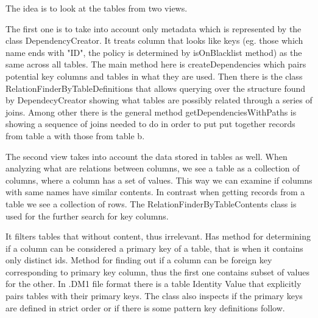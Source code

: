 The idea is to look at the tables from two views.

The first one is to take into account only metadata which is represented by the class DependencyCreator. It treats column that looks like keys (eg. those which name ends with "ID", the policy is determined by isOnBlacklist method) as the same across all tables. 
The main method here is createDependencies which pairs potential key columns and tables in what they are used.
Then there is the class RelationFinderByTableDefinitions that allows querying over the structure found by DependecyCreator showing what tables are possibly related through a series of joins.
Among other there is the general method getDependenciesWithPaths is showing a sequence of joins needed to do in order to put put together records from table a with those from table b.

The second view takes into account the data stored in tables as well. 
When analyzing what are relations between columns, we see a table as a collection of columns, where a column has a set of values. This way we can examine if columns with same names have similar contents.
In contrast when getting records from a table we see a collection of rows.
The RelationFinderByTableContents class is used for the further search for key columns.

It filters tables that without content, thus irrelevant.
Has method for determining if a column can be considered a primary key of a table, that is when it contains only distinct ids.
Method for finding out if a column can be foreign key corresponding to primary key column, thus the first one contains subset of values for the other.
In .DM1 file format there is a table Identity Value that explicitly pairs tables with their primary keys. 
The class also inspects if the primary keys are defined in strict order or if there is some pattern key definitions follow.

